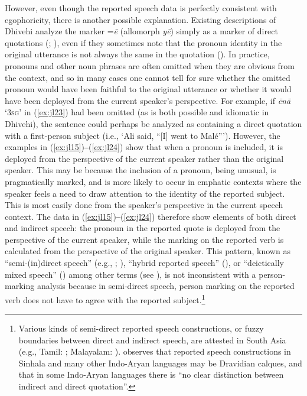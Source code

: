 \documentclass[output=paper]{langsci/langscibook}
\begin{document}
However, even though the reported speech data is perfectly consistent with egophoricity, there is another possible explanation. Existing descriptions of Dhivehi analyze the marker =\textit{ē} (allomorph \textit{yē}) simply as a marker of direct quotations (\citealt[47]{CainGair2000}; \citealt[302]{Gnanadesikan2017}), even if they sometimes note that the pronoun identity in the original utterance is not always the same in the quotation (\citealt[302--303]{Gnanadesikan2017}). In practice, pronouns and other noun phrases are often omitted when they are obvious from the context, and so in many cases one cannot tell for sure whether the omitted pronoun would have been faithful to the original utterance or whether it would have been deployed from the current speaker’s perspective. For example, if \textit{ēnā} ‘3\textsc{sg}’ in (\ref{ex:jl23}) had been omitted (as is both possible and idiomatic in Dhivehi), the sentence could perhaps be analyzed as containing a direct quotation with a first-person subject (i.e., ‘Ali said, “[I] went to Malé”’). However, the examples in (\ref{ex:jl15})‒(\ref{ex:jl24}) show that when a pronoun is included, it is deployed from the perspective of the current speaker rather than the original speaker. This may be because the inclusion of a pronoun, being unusual, is pragmatically marked, and is more likely to occur in emphatic contexts where the speaker feels a need to draw attention to the identity of the reported subject. This is most easily done from the speaker’s perspective in the current speech context. The data in (\ref{ex:jl15})‒(\ref{ex:jl24}) therefore show elements of both direct and indirect speech: the pronoun in the reported quote is deployed from the perspective of the current speaker, while the marking on the reported verb is calculated from the perspective of the original speaker. This pattern, known as “semi-(in)direct speech” (e.g., \citealt{Aikhenvald2008}; \citeyear{Aikhenvald2011}), “hybrid reported speech” (\citealt{TournadreDorje2003}), or “deictically mixed speech” (\citealt{WidmerZemp2017}) among other terms (see \citealt{Evans2012}), is not inconsistent with a person-marking analysis because in semi-direct speech, person marking on the reported verb does not have to agree with the reported subject.\footnote{Various kinds of semi-direct reported speech constructions, or fuzzy boundaries between direct and indirect speech, are attested in South Asia (e.g., Tamil: \citealt[373–375]{Lehmann1989}; Malayalam: \citealt[2–7]{AsherKumari1997}). \cite[403]{Masica1991} observes that reported speech constructions in Sinhala and many other Indo-Aryan languages may be Dravidian calques, and that in some Indo-Aryan languages there is “no clear distinction between indirect and direct quotation”.}
\end{document}
